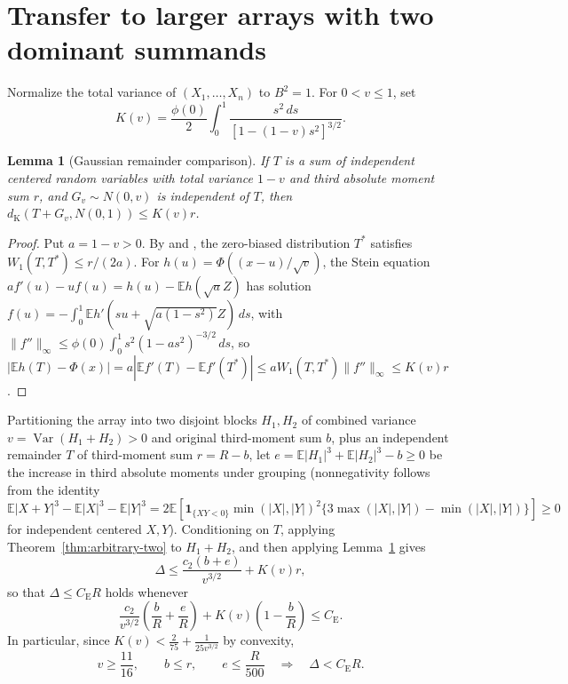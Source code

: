 \documentclass[11pt]{article}
\numberwithin{equation}{section}
\newtheorem{lemma}[theorem]{Lemma}
\theoremstyle{definition}
\theoremstyle{remark}
\DeclareMathOperator{\Var}{Var}
\newcommand{\E}{\mathbb E}
\newcommand{\ind}{\mathbf 1}
\newcommand{\be}{C_{\mathrm E}}
\begin{document}
\section{Transfer to larger arrays with two dominant summands}\label{sec:transfer}

Normalize the total variance of $(X_1,\ldots,X_n)$ to $B^2=1$. For $0<v\le1$,
set
\[
 K(v)=\frac{\phi(0)}2\int_0^1
       \frac{s^2\,ds}{[1-(1-v)s^2]^{3/2}}.
\]

\begin{lemma}[Gaussian remainder comparison]\label{lem:gaussian-comparison}
If $T$ is a sum of independent centered random variables with total variance
$1-v$ and third absolute moment sum $r$, and $G_v\sim N(0,v)$ is independent
of $T$, then $d_{\mathrm K}(T+G_v,N(0,1))\le K(v)r$.
\end{lemma}
\begin{proof}
Put $a=1-v>0$. By \citet[Lemma~1.1]{Goldstein2010} and
\citet[Theorem~3 and Corollary~1]{Tyurin2009}, the zero-biased distribution
$T^*$ satisfies $W_1(T,T^*)\le r/(2a)$. For $h(u)=\Phi((x-u)/\sqrt v)$, the
Stein equation $af'(u)-uf(u)=h(u)-\E h(\sqrt a Z)$ has solution
$f(u)=-\int_0^1\E h'(su+\sqrt{a(1-s^2)}Z)\,ds$, with
$\|f''\|_\infty\le\phi(0)\int_0^1s^2(1-as^2)^{-3/2}\,ds$, so
$|\E h(T)-\Phi(x)|=a|\E f'(T)-\E f'(T^*)|\le aW_1(T,T^*)\|f''\|_\infty\le K(v)r$.
\end{proof}

Partitioning the array into two disjoint blocks $H_1,H_2$ of combined variance
$v=\Var(H_1+H_2)>0$ and original third-moment sum $b$, plus an independent
remainder $T$ of third-moment sum $r=R-b$, let
$e=\E|H_1|^3+\E|H_2|^3-b\ge0$ be the increase in third absolute moments under
grouping (nonnegativity follows from the identity
\begin{equation}\label{eq:cubic-grouping}
 \E|X+Y|^3-\E|X|^3-\E|Y|^3
 =2\E\!\left[\ind_{\{XY<0\}}\min(|X|,|Y|)^2
       \{3\max(|X|,|Y|)-\min(|X|,|Y|)\}\right]\ge0
\end{equation}
for independent centered $X,Y$). Conditioning on $T$, applying
Theorem~\ref{thm:arbitrary-two} to $H_1+H_2$, and then applying
Lemma~\ref{lem:gaussian-comparison} gives
\begin{equation}\label{eq:cost-aware}
 \Delta\le\frac{c_2(b+e)}{v^{3/2}}+K(v)r,
\end{equation}
so that $\Delta\le\be R$ holds whenever
\begin{equation}\label{eq:cost-criterion}
 \frac{c_2}{v^{3/2}}\left(\frac bR+\frac eR\right)
 +K(v)\left(1-\frac bR\right)\le\be.
\end{equation}
In particular, since $K(v)<\frac2{75}+\frac1{25v^{3/2}}$ by convexity,
\begin{equation}\label{eq:half-resource}
 v\ge\frac{11}{16},\qquad b\le r,\qquad e\le\frac R{500}
 \quad\Longrightarrow\quad\Delta<\be R.
\end{equation}
\end{document}
